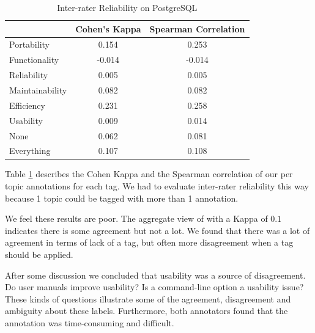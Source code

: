\documentclass[smallextended]{svjour3}       %
\begin{document}

\begin{table}
\centering
\begin{tabular}{l|c|c}
\hline
            & Cohen's Kappa & Spearman Correlation \\ \hline
Portability & 0.154 & 0.253  \\
Functionality & -0.014 & -0.014 \\
Reliability & 0.005 & 0.005 \\
Maintainability & 0.082 & 0.082 \\
Efficiency & 0.231 & 0.258 \\
Usability & 0.009 & 0.014 \\
None &      0.062 & 0.081 \\ \hline 
Everything & 0.107 & 0.108 \\ \hline
\end{tabular}
\caption{Inter-rater Reliability on PostgreSQL}
\label{tab:interr}
\end{table}

Table \ref{tab:interr} describes the Cohen Kappa and the Spearman
correlation of our per topic annotations for each tag. We had to
evaluate inter-rater reliability this way because 1 topic could be
tagged with more than 1 annotation.

We feel these results are poor. The aggregate view of with a Kappa of
$0.1$ indicates there is some agreement but not a lot. We found that
there was a lot of agreement in terms of lack of a tag, but often more
disagreement when a tag should be applied.

After some discussion we concluded that usability was a source of
disagreement. Do user manuals improve usability? Is a command-line
option a usability issue? These kinds of questions illustrate some of
the agreement, disagreement and ambiguity about these labels. Furthermore, 
both annotators found that the annotation was time-consuming and
difficult.

\end{document}
